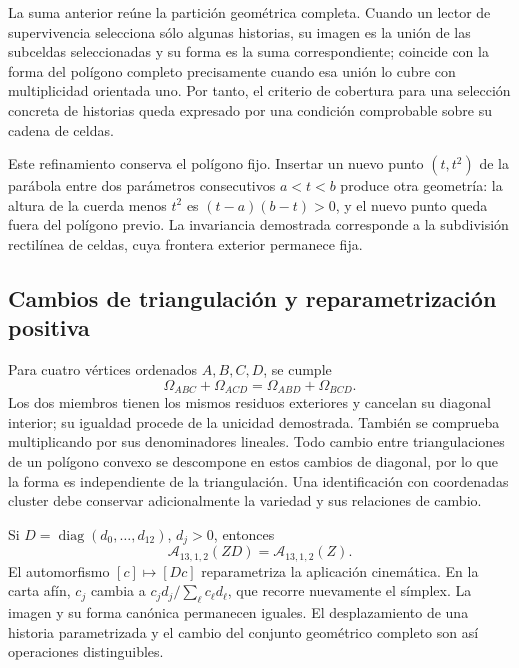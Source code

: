 \documentclass[a4paper,10pt]{article}
\theoremstyle{definition}\newtheorem{definition}[theorem]{Definición}
\theoremstyle{remark}\newtheorem{remark}[theorem]{Observación}
\numberwithin{equation}{section}
\begin{document}
La suma anterior reúne la partición geométrica completa. Cuando un lector
de supervivencia selecciona sólo algunas historias, su imagen es la unión
de las subceldas seleccionadas y su forma es la suma correspondiente;
coincide con la forma del polígono completo precisamente cuando esa unión
lo cubre con multiplicidad orientada uno. Por tanto, el criterio de
cobertura para una selección concreta de historias queda expresado por
una condición comprobable sobre su cadena de celdas.

Este refinamiento conserva el polígono fijo. Insertar un nuevo punto
\((t,t^2)\) de la parábola entre dos parámetros consecutivos \(a<t<b\)
produce otra geometría: la altura de la cuerda menos \(t^2\) es
\((t-a)(b-t)>0\), y el nuevo punto queda fuera del polígono previo.
La invariancia demostrada corresponde a la subdivisión rectilínea de
celdas, cuya frontera exterior permanece fija.

\subsection{Cambios de triangulación y reparametrización positiva}

Para cuatro vértices ordenados \(A,B,C,D\), se cumple
\begin{equation}
 \Omega_{ABC}+\Omega_{ACD}=\Omega_{ABD}+\Omega_{BCD}.
 \label{eq:polygon-flip}
\end{equation}
Los dos miembros tienen los mismos residuos exteriores y cancelan su
diagonal interior; su igualdad procede de la unicidad demostrada.
También se comprueba multiplicando por sus denominadores lineales.
Todo cambio entre triangulaciones de un polígono convexo se descompone
en estos cambios de diagonal, por lo que la forma es independiente
de la triangulación. Una identificación con coordenadas cluster debe
conservar adicionalmente la variedad y sus relaciones de cambio.

Si \(D=\operatorname{diag}(d_0,\ldots,d_{12})\), \(d_j>0\), entonces
\begin{equation}
 \mathcal A_{13,1,2}(ZD)=\mathcal A_{13,1,2}(Z).
 \label{eq:polygon-rescale}
\end{equation}
El automorfismo \([c]\mapsto[Dc]\) reparametriza la aplicación cinemática.
En la carta afín, \(c_j\) cambia a
\(c_jd_j/\sum_\ell c_\ell d_\ell\), que recorre nuevamente el símplex.
La imagen y su forma canónica permanecen iguales. El desplazamiento
de una historia parametrizada y el cambio del conjunto geométrico
completo son así operaciones distinguibles.
\end{document}
